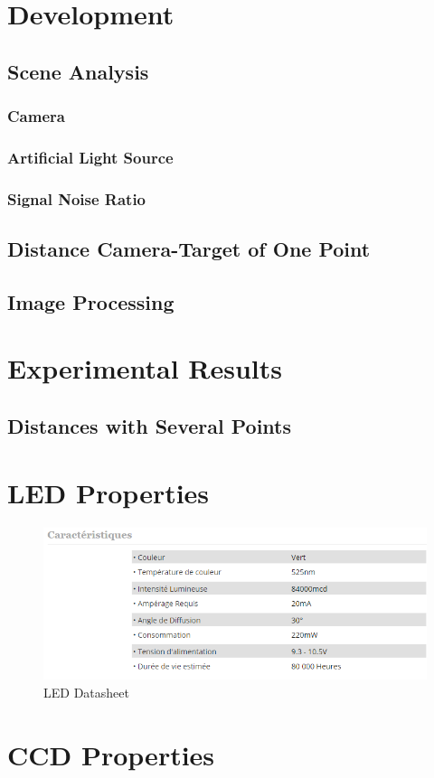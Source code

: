 \documentclass[12pt,a4paper,fleqn, onesside]{report}
\begin{document}
\chapter{Development}
\section{Scene Analysis}
\subsection{Camera}

\subsection{Artificial Light Source}

\subsection{Signal Noise Ratio}


\section{Distance Camera-Target of One Point}

\section{Image Processing}



\chapter{Experimental Results}
\section{Distances with Several Points}


\appendix
\chapter{LED Properties}
\label{LEDdatasheet}
\begin{figure}[h]
  \centerline{\includegraphics[scale=0.8]{fig/LedDataSheet.png}}
  \caption{LED Datasheet}
  \label{fig:LEDdatasheet}
\end{figure}

\chapter{CCD Properties}
\label{CCDdatasheet}





\end{document}
